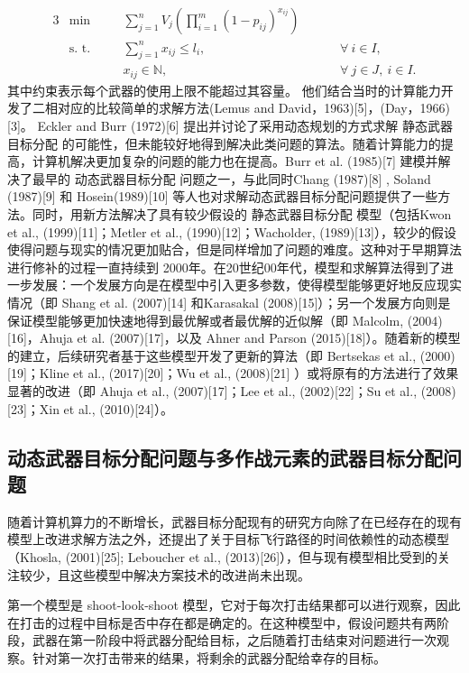 \begin{alignat}{3}
    &\min\quad && \sum_{j=1}^n V_j \left( \prod_{i=1}^m (1 - p_{ij}) ^ {x_{ij}}  \right) \tag{P1.1} \\ 
    &\text{s. t.}\quad &&\sum_{j=1}^n x_{ij} \leq l_i, \quad &\hspace{1cm}\forall ~ i \in I, \tag{P1.2}\\
    & && x_{ij} \in \mathbb{N}, \quad &\hspace{1cm}\forall ~ j\in J, ~ i \in I. \tag{P1.3}
\end{alignat}
其中约束表示每个武器的使用上限不能超过其容量。
他们结合当时的计算能力开发了二相对应的比较简单的求解方法(Lemus and David，1963)[5]，(Day，1966)[3]。 Eckler and Burr (1972)[6] 提出并讨论了采用动态规划的方式求解 静态武器目标分配 的可能性，但未能较好地得到解决此类问题的算法。随着计算能力的提高，计算机解决更加复杂的问题的能力也在提高。Burr et al. (1985)[7] 建模并解决了最早的 动态武器目标分配 问题之一，与此同时Chang (1987)[8] , Soland (1987)[9] 和 Hosein(1989)[10] 等人也对求解动态武器目标分配问题提供了一些方法。同时，用新方法解决了具有较少假设的 静态武器目标分配 模型（包括Kwon et al., (1999)[11]；Metler et al., (1990)[12]；Wacholder, (1989)[13]），较少的假设使得问题与现实的情况更加贴合，但是同样增加了问题的难度。这种对于早期算法进行修补的过程一直持续到 2000年。在20世纪00年代，模型和求解算法得到了进一步发展：一个发展方向是在模型中引入更多参数，使得模型能够更好地反应现实情况（即 Shang et al. (2007)[14] 和Karasakal (2008)[15]）；另一个发展方向则是保证模型能够更加快速地得到最优解或者最优解的近似解（即 Malcolm, (2004)[16]，Ahuja et al. (2007)[17]，以及 Ahner and Parson (2015)[18]）。随着新的模型的建立，后续研究者基于这些模型开发了更新的算法（即 Bertsekas et al., (2000)[19]；Kline et al., (2017)[20]；Wu et al., (2008)[21] ）或将原有的方法进行了效果显著的改进（即 Ahuja et al., (2007)[17]；Lee et al., (2002)[22]；Su et al., (2008)[23]；Xin et al., (2010)[24]）。

\subsection{动态武器目标分配问题与多作战元素的武器目标分配问题}
随着计算机算力的不断增长，武器目标分配现有的研究方向除了在已经存在的现有模型上改进求解方法之外，还提出了关于目标飞行路径的时间依赖性的动态模型 （Khosla, (2001)[25]; Leboucher et al., (2013)[26]），但与现有模型相比受到的关注较少，且这些模型中解决方案技术的改进尚未出现。

第一个模型是 shoot-look-shoot 模型，它对于每次打击结果都可以进行观察，因此在打击的过程中目标是否中存在都是确定的。在这种模型中，假设问题共有两阶段，武器在第一阶段中将武器分配给目标，之后随着打击结束对问题进行一次观察。针对第一次打击带来的结果，将剩余的武器分配给幸存的目标。

